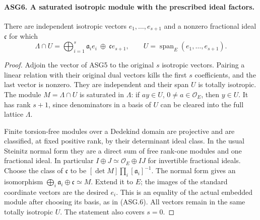 \documentclass[11pt,a4paper]{article}
\numberwithin{equation}{section}
\theoremstyle{remark}\newtheorem{remark}[theorem]{Remark}
\begin{document}
\paragraph{ASG6. A saturated isotropic module with the prescribed ideal factors.}
\label{claim:ASG6}
There are independent isotropic vectors \(e_1,\ldots,e_{s+1}\)
and a nonzero fractional ideal \(\mathfrak c\) for which
\[
 \Lambda\cap U=\bigoplus_{i=1}^{s}\mathfrak a_i e_i
                             \ \oplus\ \mathfrak c e_{s+1},
 \qquad U=\operatorname{span}_E(e_1,\ldots,e_{s+1}).
\tag{ASG.6}
\]
\begin{proof}
Adjoin the vector of ASG5 to the original \(s\) isotropic
vectors.  Pairing a linear relation with their original dual vectors
kills the first \(s\) coefficients, and the last vector is nonzero.
They are independent and their span \(U\) is totally isotropic.
The module \(M=\Lambda\cap U\) is saturated in \(\Lambda\):
if \(ay\in U\), \(0\ne a\in\mathcal O_E\), then \(y\in U\).
It has rank \(s+1\), since denominators in a basis of \(U\)
can be cleared into the full lattice \(\Lambda\).

Finite torsion-free modules over a Dedekind domain are projective and
are classified, at fixed positive rank, by their determinant ideal
class.  In the usual Steinitz normal form they are a direct sum of
free rank-one modules and one fractional ideal.  In particular
\(I\oplus J\simeq\mathcal O_E\oplus IJ\) for invertible
fractional ideals.  Choose the class of \(\mathfrak c\) to be
\([\det M]\prod_i[\mathfrak a_i]^{-1}\).
The normal form gives an isomorphism
\(\bigoplus_i\mathfrak a_i\oplus\mathfrak c\simeq M\).
Extend it to \(E\); the images of the standard coordinate vectors
are the desired \(e_i\).  This is an equality of the actual
embedded module after choosing its basis, as in (ASG.6).
All vectors remain in the same totally isotropic \(U\).
The statement also covers \(s=0\).
\end{proof}

\end{document}
